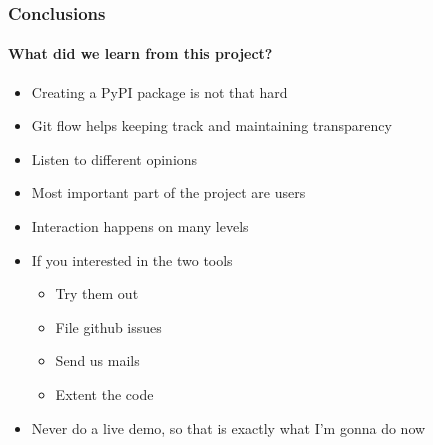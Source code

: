 \documentclass[9pt]{beamer}
\begin{document}
\begin{frame}
\frametitle{Conclusions}
\framesubtitle{What did we learn from this project?}
\begin{itemize}%
	\item Creating a PyPI package is not that hard
	\item Git flow helps keeping track and maintaining transparency
	\item Listen to different opinions %
	\item Most important part of the project are users
	\item Interaction happens on many levels
	\item If you interested in the two tools
	\begin{itemize}
		\item Try them out
		\item File github issues
		\item Send us mails
		\item Extent the code
	\end{itemize}
	\item Never do a live demo, so that is exactly what I'm gonna do now
\end{itemize}
\end{frame} 
\end{document}
